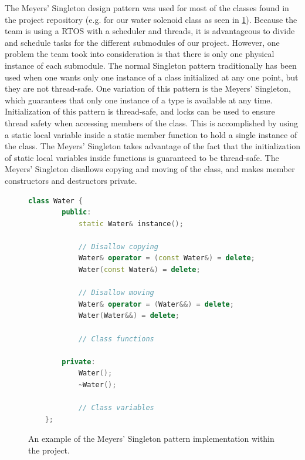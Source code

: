 \documentclass[journal]{IEEEtran}
\begin{document}
The Meyers' Singleton design pattern was used for most of the classes found in the project repository 
(e.g. for our water solenoid class as seen in \ref{fig:singleton_implementation}). Because the team is 
using a RTOS with a scheduler and threads, it is advantageous to divide and schedule tasks for the different 
submodules of our project. However, one problem the team took into consideration is that there is only one 
physical instance of each submodule. The normal Singleton pattern traditionally has been used when one wants 
only one instance of a class initialized at any one point, but they are not thread-safe. One variation of this 
pattern is the Meyers' Singleton, which guarantees that only one instance of a type is available at any time. 
Initialization of this pattern is thread-safe, and locks can be used to ensure thread safety when accessing 
members of the class. This is accomplished by using a static local variable inside a static member function 
to hold a single instance of the class. The Meyers' Singleton takes advantage of the fact that the initialization 
of static local variables inside functions is guaranteed to be thread-safe. The Meyers' Singleton disallows 
copying and moving of the class, and makes member constructors and destructors private\cite{Meyers}.

\lstset{style=mystyle}

\begin{figure}
	\centering
	\label{fig:singleton_implementation}

	\begin{lstlisting}[language=C++]
    class Water { 
        public:
            static Water& instance();

            // Disallow copying
            Water& operator = (const Water&) = delete;
            Water(const Water&) = delete;

            // Disallow moving
            Water& operator = (Water&&) = delete;
            Water(Water&&) = delete;

            // Class functions
        
        private:
            Water();
            ~Water();

            // Class variables
    };
\end{lstlisting}
	\caption{An example of the Meyers' Singleton pattern implementation within the project.}
\end{figure}
\end{document}

